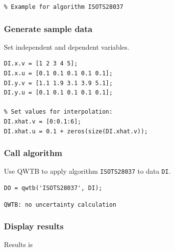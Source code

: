 \startcontents[localtoc]

\begin{lstlisting}
% Example for algorithm ISOTS28037
\end{lstlisting}


{}
\subsubsection*{Generate sample data}



Set independent and dependent variables.

\begin{lstlisting}
DI.x.v = [1 2 3 4 5];
DI.x.u = [0.1 0.1 0.1 0.1 0.1];
DI.y.v = [1.1 1.9 3.1 3.9 5.1];
DI.y.u = [0.1 0.1 0.1 0.1 0.1];

% Set values for interpolation:
DI.xhat.v = [0:0.1:6];
DI.xhat.u = 0.1 + zeros(size(DI.xhat.v));
\end{lstlisting}


{}
\subsubsection*{Call algorithm}



Use QWTB to apply algorithm \texttt{ISOTS28037} to data \texttt{DI}.

\begin{lstlisting}
DO = qwtb('ISOTS28037', DI);
\end{lstlisting}
\begin{lstlisting}[language={},xleftmargin=5pt,frame=none]
QWTB: no uncertainty calculation

\end{lstlisting}


{}
\subsubsection*{Display results}



Results is

